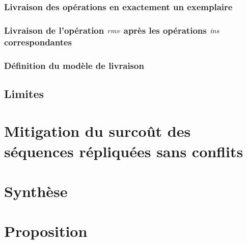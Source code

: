 \subsubsection{Livraison des opérations en exactement un exemplaire}


\subsubsection{Livraison de l'opération $\mathit{rmv}$ après les opérations $\mathit{ins}$ correspondantes}


\subsubsection{Définition du modèle de livraison}


\subsection{Limites}


\section{Mitigation du surcoût des séquences répliquées sans conflits}


\section{Synthèse}


\section{Proposition}

